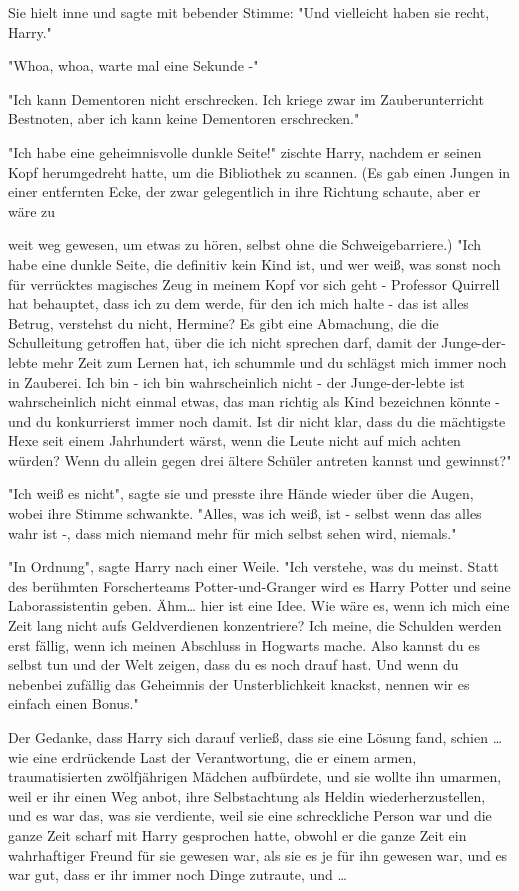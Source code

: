 {Sie hielt inne und sagte mit bebender Stimme: "Und vielleicht haben sie recht, Harry."

"Whoa, whoa, warte mal eine Sekunde -"

"Ich kann Dementoren nicht erschrecken. Ich kriege zwar im Zauberunterricht Bestnoten, aber ich kann keine Dementoren erschrecken."

"Ich habe eine geheimnisvolle dunkle Seite!" zischte Harry, nachdem er seinen Kopf herumgedreht hatte, um die Bibliothek zu scannen. (Es gab einen Jungen in einer entfernten Ecke, der zwar gelegentlich in ihre Richtung schaute, aber er wäre zu

weit weg gewesen, um etwas zu hören, selbst ohne die Schweigebarriere.) "Ich habe eine dunkle Seite, die definitiv kein Kind ist, und wer weiß, was sonst noch für verrücktes magisches Zeug in meinem Kopf vor sich geht - Professor Quirrell hat behauptet, dass ich zu dem werde, für den ich mich halte - das ist alles Betrug, verstehst du nicht, Hermine? Es gibt eine Abmachung, die die Schulleitung getroffen hat, über die ich nicht sprechen darf, damit der Junge-der-lebte mehr Zeit zum Lernen hat, ich schummle und du schlägst mich immer noch in Zauberei. Ich bin - ich bin wahrscheinlich nicht - der Junge-der-lebte ist wahrscheinlich nicht einmal etwas, das man richtig als Kind bezeichnen könnte - und du konkurrierst immer noch damit. Ist dir nicht klar, dass du die mächtigste Hexe seit einem Jahrhundert wärst, wenn die Leute nicht auf mich achten würden? Wenn du allein gegen drei ältere Schüler antreten kannst und gewinnst?"

"Ich weiß es nicht", sagte sie und presste ihre Hände wieder über die Augen, wobei ihre Stimme schwankte. "Alles, was ich weiß, ist - selbst wenn das alles wahr ist -, dass mich niemand mehr für mich selbst sehen wird, niemals."

"In Ordnung", sagte Harry nach einer Weile. "Ich verstehe, was du meinst. Statt des berühmten Forscherteams Potter-und-Granger wird es Harry Potter und seine Laborassistentin geben. Ähm… hier ist eine Idee. Wie wäre es, wenn ich mich eine Zeit lang nicht aufs Geldverdienen konzentriere? Ich meine, die Schulden werden erst fällig, wenn ich meinen Abschluss in Hogwarts mache. Also kannst du es selbst tun und der Welt zeigen, dass du es noch drauf hast. Und wenn du nebenbei zufällig das Geheimnis der Unsterblichkeit knackst, nennen wir es einfach einen Bonus."

Der Gedanke, dass Harry sich darauf verließ, dass sie eine Lösung fand, schien … wie eine erdrückende Last der Verantwortung, die er einem armen, traumatisierten zwölfjährigen Mädchen aufbürdete, und sie wollte ihn umarmen, weil er ihr einen Weg anbot, ihre Selbstachtung als Heldin wiederherzustellen, und es war das, was sie verdiente, weil sie eine schreckliche Person war und die ganze Zeit scharf mit Harry gesprochen hatte, obwohl er die ganze Zeit ein wahrhaftiger Freund für sie gewesen war, als sie es je für ihn gewesen war, und es war gut, dass er ihr immer noch Dinge zutraute, und …

}
